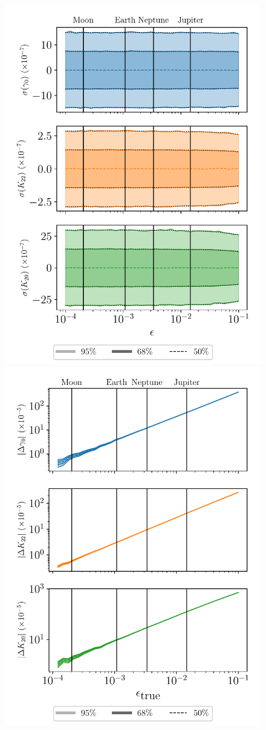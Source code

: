 \documentclass[fleqn,usenatbib]{mnras}
\begin{document}
\begin{figure}
  \centering
  \includegraphics[width=0.88\columnwidth]{figs/oblateness.pdf}
  \vfill
  \includegraphics[width=0.88\columnwidth]{figs/oblateness-differ.pdf}

\end{figure}
\end{document}
